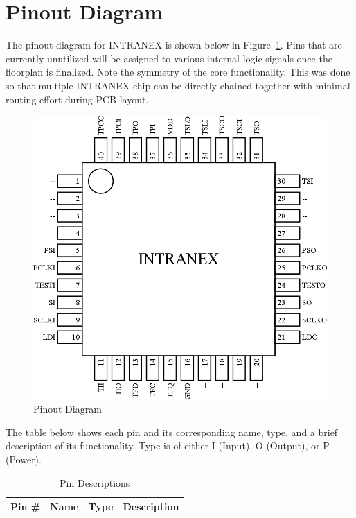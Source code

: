 \section{Pinout Diagram}

The pinout diagram for INTRANEX is shown below in Figure~\ref{fig:pinout}.
Pins that are currently unutilized will be assigned to various internal logic
signals once the floorplan is finalized. Note the symmetry of the core
functionality.  This was done so that multiple INTRANEX chip can be directly
chained together with minimal routing effort during PCB layout.

\begin{figure}[H]
    \centering
    \includegraphics[width=\linewidth]{../pinout/pinout.png}
    \caption{Pinout Diagram}
    \label{fig:pinout}
\end{figure}

\newpage
The table below shows each pin and its corresponding name, type, and a brief
description of its functionality. Type is of either I (Input), O (Output), or P
(Power).
\begin{table}[H]
    \begin{tabularx}{\textwidth}{|l|l|c|X|}
        \hline
        \textbf{Pin \#} & \textbf{Name} & \textbf{Type} & \textbf{Description} \\
        \hline
        
    \end{tabularx}
    \caption{Pin Descriptions}
\end{table}

